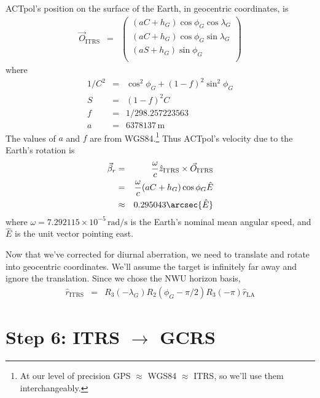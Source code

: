 \documentclass[10pt,preprint]{aastex}
\newcommand{\Ovec}{{\vec O}}
\newcommand{\east}{{\hat E}}
\newcommand{\zhat}{{\hat z}}
\newcommand{\ITRS}{\mathrm{ITRS}}
\newcommand{\LA}{\mathrm{LA}}
\newcommand{\rhat}{{\hat r}}
\begin{document}
ACTpol's position on the surface of the Earth, in geocentric coordinates, is
\begin{eqnarray}
\Ovec_\ITRS &=& \left(\begin{array}{l}
(aC+h_G) \cos\phi_G \cos\lambda_G \\
(aC+h_G) \cos\phi_G \sin\lambda_G \\
(aS+h_G) \sin\phi_G \\
\end{array}\right)
\end{eqnarray}
where
\begin{eqnarray}
1/C^2 &=& \cos^2\phi_G + (1-f)^2\sin^2\phi_G \\
S &=& (1-f)^2 C \\
f &=& 1/298.257223563 \\
a &=& 6378137\,\mathrm{m}
\end{eqnarray}
The values of $a$ and $f$ are from WGS84.\footnote{
At our level of precision GPS $\approx$ WGS84 $\approx$ ITRS, so we'll use them interchangeably.}
Thus ACTpol's velocity due to the Earth's rotation is
\begin{eqnarray}
\vec\beta_r &=& \frac{\omega}{c}\zhat_\ITRS\times\Ovec_\ITRS
\\
&=& \frac{\omega}{c} (aC+h_G) \cos\phi_G \east
\\
&\approx& 0.295043 \arcsec\east
\end{eqnarray}
where $\omega = 7.292115\times10^{-5}\,\mathrm{rad/s}$ is the Earth's nominal mean angular speed,
and $\east$ is the unit vector pointing east.

Now that we've corrected for diurnal aberration, we need to translate and rotate into geocentric
coordinates. We'll assume the target is infinitely far away and ignore the translation.
Since we chose the NWU horizon basis,
\begin{eqnarray}
\rhat_\ITRS &=& R_3(-\lambda_G) R_2(\phi_G-\pi/2) R_3(-\pi) \rhat_\LA
\end{eqnarray}

\section{Step 6: ITRS $\to$ GCRS}
\end{document}
